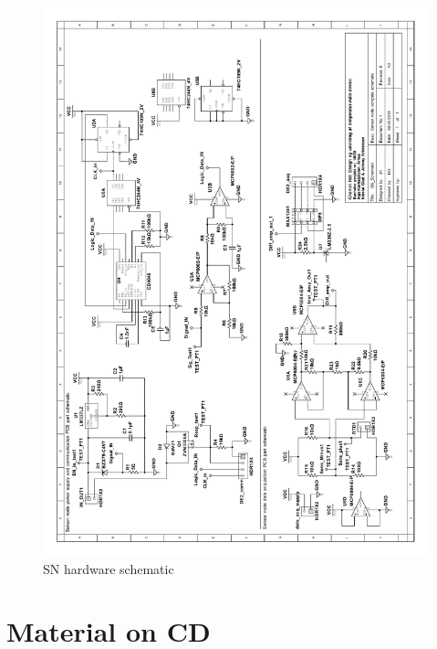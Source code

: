 \begin{figure}[H]
	\centering
	\includegraphics[width=1\textwidth]{billeder/11projectdescription/SN_schematic_rotated}
	\caption{SN hardware schematic}
	\label{schematic:SN}
\end{figure}

\chapter{Material on CD}

\listoffixmes
